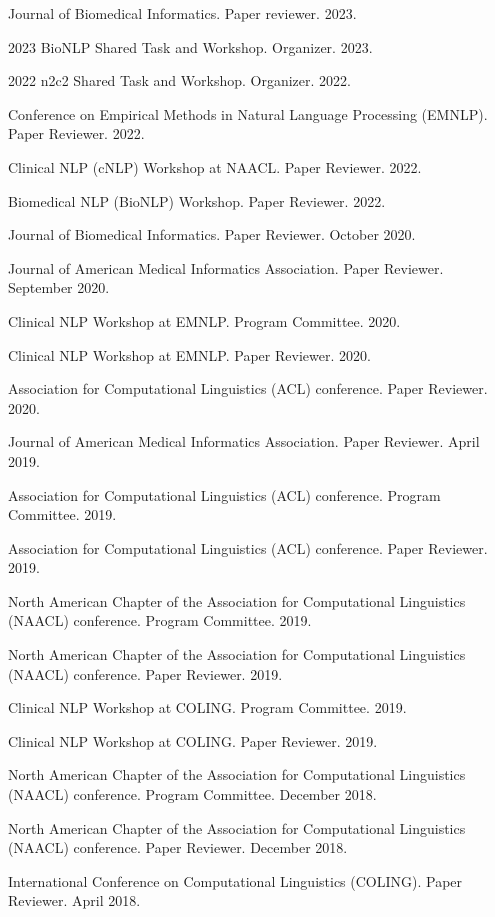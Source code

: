 \documentclass[letterpaper]{article}
\renewenvironment{itemize}{
  \begin{list}{}{
    \setlength{\leftmargin}{1.5em}
  }
}{
  \end{list}
}
\begin{document}
\begin{itemize}
\item Journal of Biomedical Informatics. Paper reviewer. 2023.
\item 2023 BioNLP Shared Task and Workshop. Organizer. 2023.
\item 2022 n2c2 Shared Task and Workshop. Organizer. 2022.
\item Conference on Empirical Methods in Natural Language Processing (EMNLP). Paper Reviewer. 2022.
\item Clinical NLP (cNLP) Workshop at NAACL. Paper Reviewer. 2022.
\item Biomedical NLP (BioNLP) Workshop. Paper Reviewer. 2022.
\item Journal of Biomedical Informatics. Paper Reviewer. October 2020.
\item Journal of American Medical Informatics Association. Paper Reviewer. September 2020.
\item Clinical NLP Workshop at EMNLP. Program Committee. 2020.
\item Clinical NLP Workshop at EMNLP. Paper Reviewer. 2020.
\item Association for Computational Linguistics (ACL) conference. Paper Reviewer. 2020.
\item Journal of American Medical Informatics Association. Paper Reviewer. April 2019.
\item Association for Computational Linguistics (ACL) conference. Program Committee. 2019.
\item Association for Computational Linguistics (ACL) conference. Paper Reviewer. 2019.
\item North American Chapter of the Association for Computational Linguistics (NAACL) conference. Program Committee. 2019.
\item North American Chapter of the Association for Computational Linguistics (NAACL) conference. Paper Reviewer. 2019.
\item Clinical NLP Workshop at COLING. Program Committee. 2019.
\item Clinical NLP Workshop at COLING. Paper Reviewer. 2019.
\item North American Chapter of the Association for Computational Linguistics (NAACL) conference. Program Committee. December 2018.
\item North American Chapter of the Association for Computational Linguistics (NAACL) conference. Paper Reviewer. December 2018.
\item International Conference on Computational Linguistics (COLING). Paper Reviewer. April 2018.

\end{itemize}
\end{document}
